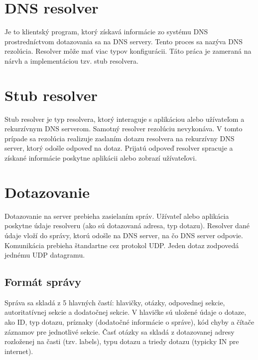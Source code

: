 \section{DNS resolver}
\label{DNS resolver}
Je to klientský program, ktorý získavá informácie zo systému DNS prostredníctvom dotazovania sa na DNS servery. Tento proces sa nazýva DNS rezolúcia.
Resolver môže mať viac typov konfigurácii. 
Táto práca je zameraná na nárvh a implementáciou tzv. stub resolvera.



\section{Stub resolver}
\label{Stub resolver}
Stub resolver je typ resolvera, ktorý interaguje s aplikáciou alebo užívateľom a rekurzívnym DNS serverom. Samotný resolver rezolúciu nevykonáva.
V tomto prípade sa rezolúcia realizuje zaslaním dotazu resolvera na rekurzívny DNS server, ktorý odošle odpoveď na dotaz.
Prijatú odpoveď resolver spracuje a získané informácie poskytne aplikácii alebo zobrazí užívateľovi.

\section{Dotazovanie}
\label{Dotazovanie}

Dotazovanie na server prebieha zasielaním správ. Užívateľ alebo aplikácia poskytne údaje resolveru (ako sú dotazovaná adresa, typ dotazu).
Resolver dané údaje vloží do správy, ktorú odošle na DNS server, na čo DNS server odpovie. Komunikácia prebieha štandartne cez protokol UDP. Jeden dotaz zodpovedá jednému UDP datagramu.

\subsection{Formát správy}
\label{Formát správy}

Správa sa skladá z 5 hlavných častí: hlavičky, otázky, odpovednej sekcie, autoritatívnej sekcie a dodatočnej sekcie. 
V hlavičke sú uložené údaje o dotaze, ako ID, typ dotazu, príznaky (dodatočné informácie o správe), kód chyby a čítače záznamov pre jednotlivé sekcie.
Časť otázky sa skladá z dotazovanej adresy rozloženej na časti (tzv. labels), typu dotazu a triedy dotazu (typicky IN pre internet). 

\newpage


